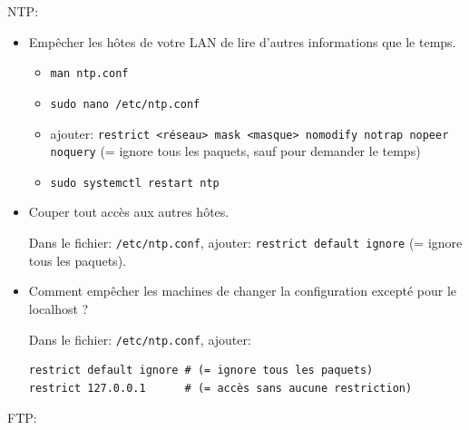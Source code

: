 \documentclass[a4paper]{article}
\begin{document}
NTP:
\begin{itemize}

\item Empêcher les hôtes de votre LAN de lire d'autres informations que le temps.
\begin{example}
    \begin{itemize}
        \item \texttt{man ntp.conf}
        \item \texttt{sudo nano /etc/ntp.conf}
        \item ajouter: \texttt{restrict <réseau> mask <masque> nomodify notrap nopeer noquery} (= ignore tous les paquets, sauf pour demander le temps)
        \item \texttt{sudo systemctl restart ntp}
    \end{itemize}
\end{example}

\item Couper tout accès aux autres hôtes.
\begin{example}
    Dans le fichier: \texttt{/etc/ntp.conf}, ajouter: \texttt{restrict default ignore} (= ignore tous les paquets).
\end{example}

\item Comment empêcher les machines de changer la configuration excepté pour le localhost ?
\begin{example}
    Dans le fichier: \texttt{/etc/ntp.conf}, ajouter:
    \begin{verbatim}
restrict default ignore # (= ignore tous les paquets)
restrict 127.0.0.1      # (= accès sans aucune restriction)
    \end{verbatim}
\end{example}

\end{itemize}
FTP:
\end{document}

